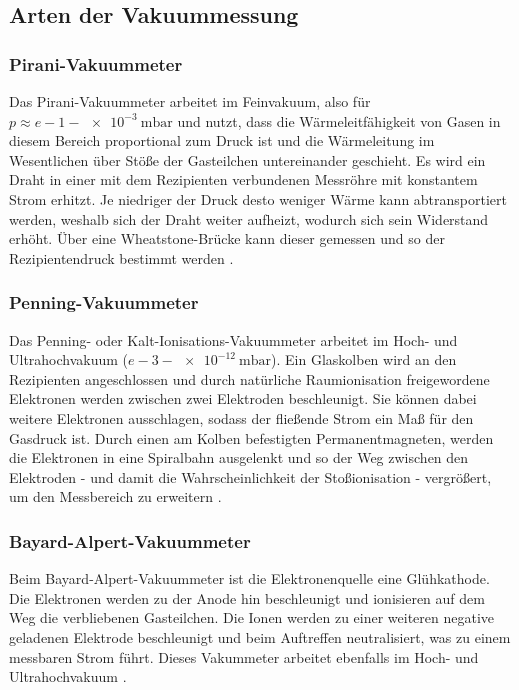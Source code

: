 \subsection{Arten der Vakuummessung}

\subsubsection{Pirani-Vakuummeter}

Das Pirani-Vakuummeter arbeitet im Feinvakuum, also für $p\approx e-1 - \SI{e-3}{\milli\bar}$ und nutzt, dass die Wärmeleitfähigkeit von Gasen in diesem Bereich proportional zum Druck ist und die Wärmeleitung im Wesentlichen über Stöße der Gasteilchen untereinander geschieht. Es wird ein Draht in einer mit dem Rezipienten verbundenen Messröhre mit konstantem Strom erhitzt. Je niedriger der Druck desto weniger Wärme kann abtransportiert werden, weshalb sich der Draht weiter aufheizt, wodurch sich sein Widerstand erhöht. Über eine Wheatstone-Brücke kann dieser gemessen und so der Rezipientendruck bestimmt werden \cite{Jena}.

\subsubsection{Penning-Vakuummeter}

Das Penning- oder Kalt-Ionisations-Vakuummeter arbeitet im Hoch- und Ultrahochvakuum ($e-3 - \SI{e-12}{\milli\bar}$). Ein Glaskolben wird an den Rezipienten angeschlossen und durch natürliche Raumionisation freigewordene Elektronen werden zwischen zwei Elektroden beschleunigt. Sie können dabei weitere Elektronen ausschlagen, sodass der fließende Strom ein Maß für den Gasdruck ist. Durch einen am Kolben befestigten Permanentmagneten, werden die Elektronen in eine Spiralbahn ausgelenkt und so der Weg zwischen den Elektroden - und damit die Wahrscheinlichkeit der Stoßionisation - vergrößert, um den Messbereich zu erweitern \cite{Jena}.

\subsubsection{Bayard-Alpert-Vakuummeter}

Beim Bayard-Alpert-Vakuummeter ist die Elektronenquelle eine Glühkathode. Die Elektronen werden zu der Anode hin beschleunigt und ionisieren auf dem Weg die verbliebenen Gasteilchen. Die Ionen werden zu einer weiteren negative geladenen Elektrode beschleunigt und beim Auftreffen neutralisiert, was zu einem messbaren Strom führt. Dieses Vakummeter arbeitet ebenfalls im Hoch- und Ultrahochvakuum \cite{Spektrum}.
